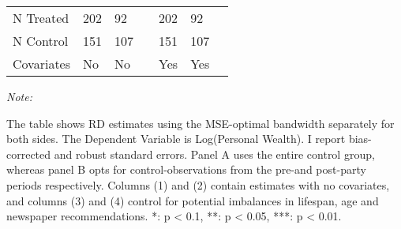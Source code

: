 \begin{table}[!h]
\begin{threeparttable}
\begin{tabular}[t]{lllrllr}
\hspace{1em}N Treated & 202 & 92 &  & 202 & 92 & \\
\hspace{1em}N Control & 151 & 107 &  & 151 & 107 & \\
\hspace{1em}Covariates & No & No &  & Yes & Yes & \\
\bottomrule
\end{tabular}
\begin{tablenotes}[para]
\item \textit{Note: } 
\item The table shows RD estimates using the MSE-optimal bandwidth \citep{cattaneo2019practical} separately for both sides. The Dependent Variable is Log(Personal Wealth). I report bias-corrected and robust standard errors. Panel A uses the entire control group, whereas panel B opts for control-observations from the pre-and post-party periods respectively. Columns (1) and (2) contain estimates with no covariates, and columns (3) and (4) control for potential imbalances in lifespan, age and newspaper recommendations. *: p < 0.1, **: p < 0.05, ***: p < 0.01.
\end{tablenotes}
\end{threeparttable}
\end{table}
